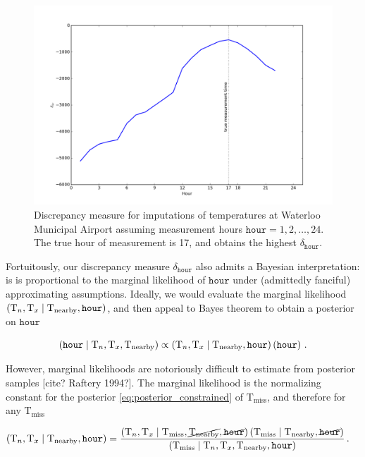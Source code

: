 \documentclass[letter]{article}
\makeatletter
\def\maxwidth{\ifdim\Gin@nat@width>\linewidth\linewidth
\else\Gin@nat@width\fi}
\let\Oldincludegraphics\includegraphics
\renewcommand{\includegraphics}[1]{\Oldincludegraphics[width=.8\maxwidth]{#1}}
\newcommand{\genericdel}[3]{%
      \left#1#3\right#2
    }
\newcommand{\del}[1]{\genericdel(){#1}}
\let\Pr\relax
\DeclareMathOperator{\Pr}{\mathbb{P}}
\newcommand{\T}{\mathrm{T}}
\newcommand{\Tn}{\T_{n}}
\newcommand{\Tx}{\T_{x}}
\newcommand{\miss}{\mathrm{miss}}
\newcommand{\obs}{\mathrm{nearby}}
\newcommand{\hour}{\mathtt{hour}}
\newcommand{\discrepancy}{\delta}
\makeatother
\begin{document}
        \begin{figure}
\centering
\includegraphics{figures/hr_inference.png}
\caption{\label{fig:hr_inference} Discrepancy measure for imputations of temperatures at Waterloo Municipal Airport assuming measurement hours \(\hour=1,2,\ldots,24\). The true hour of measurement is 17, and obtains the highest \(\delta_\hour\).}
\end{figure}
    


        Fortuitously, our discrepancy measure \(\discrepancy_\hour\) also admits a Bayesian interpretation: is is proportional to the marginal likelihood of \(\hour\) under (admittedly fanciful) approximating assumptions.
Ideally, we would evaluate the marginal likelihood \(\Pr\del{\Tn,\Tx \mid \T_\obs, \hour}\), and then appeal to Bayes theorem to obtain a posterior on \(\hour\)

\begin{equation}
    \Pr\del{\hour \mid \Tn, \Tx, \T_\obs } \propto \Pr\del{\Tn,\Tx \mid \T_\obs, \hour} \Pr\del{\hour}\,.
\end{equation}

However, marginal likelihoods are notoriously difficult to estimate from posterior samples {[}cite? Raftery 1994?{]}.
The marginal likelihood is the normalizing constant for the posterior \eqref{eq:posterior_constrained} of \(\T_\miss\), and therefore for any \(\T_\miss\)

\begin{equation}
\begin{split}
    \Pr\del{\Tn,\Tx \mid \T_\obs, \hour} &= \frac{
        \Pr\del{\Tn,\Tx \mid \T_\miss, \cancel{\T_\obs}, \cancel{\hour}} 
        \Pr\del{\T_\miss \mid \T_\obs, \cancel{\hour}}
    } { 
        \Pr\del{\T_\miss \mid \Tn,\Tx,\T_\obs, \hour}
    }\,.
\end{split}
\end{equation}
\end{document}
